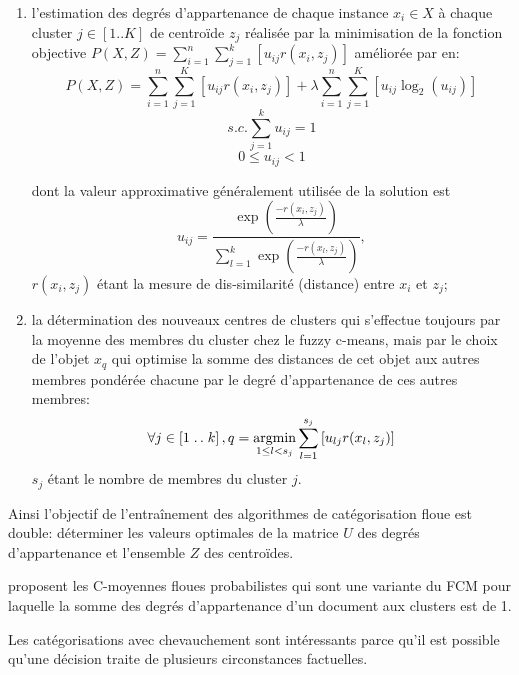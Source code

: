 \begin{enumerate}
 \item l'estimation des degrés d'appartenance de chaque instance $x_i \in X$ à chaque cluster $j \in [1..K]$ de centroïde $z_j$ réalisée par la minimisation de la fonction objective $P(X,Z) = \sum\limits_{i=1}^{n}\sum\limits_{j=1}^{k} \left[u_{ij}r(x_i,z_j)\right]$ \citep{krishnapuram2001fuzzycmedoids}  améliorée par \citet{sabzi2011fuzzykmedoids} en:
 \[P(X,Z) = \sum\limits_{i=1}^{n}\sum\limits_{j=1}^{K} \left[u_{ij}r(x_i,z_j)\right] + \lambda \sum\limits_{i=1}^{n}\sum\limits_{j=1}^{K} \left[ u_{ij}\log_2(u_{ij}) \right] \]
 \[s.c. \sum\limits_{j=1}^{k} u_{ij} = 1\]
 \[0 \leq u_{ij} < 1\]
 
 dont la valeur approximative généralement utilisée de la solution est \[u_{ij} = \frac{\exp\left(\frac{-r(x_i,z_j)}{\lambda}\right)}{\sum_{l=1}^{k}\exp\left(\frac{-r(x_l,z_j)}{\lambda}\right)},\] $r(x_i,z_j)$ étant la mesure de dis-similarité (distance) entre $x_i$ et  $z_j$;
 \item la détermination des nouveaux centres de clusters qui s'effectue toujours par la moyenne des membres du cluster chez le fuzzy c-means, mais par le choix de l'objet $x_q$ qui optimise la somme des distances de cet objet aux autres membres pondérée chacune par le degré d'appartenance de ces autres membres: \[\forall j \in  \left[1\mathrel{{.}\,{.}}\nobreak k \right], q = \mathop{\mathrm{argmin}}\limits\limits_{1 \leq l < s_j} \sum\limits_{l=1}^{s_j} \left[u_{lj}r(x_l,z_j)\right]\] $s_j$ étant le nombre de membres du cluster $j$.
\end{enumerate}
 Ainsi l'objectif de l'entraînement des algorithmes de catégorisation floue est double: déterminer les valeurs optimales de la matrice $U$ des degrés d'appartenance et l'ensemble $Z$ des centroïdes. 
 
 \citet{nefti2004probabilisticFuzzyCMeans} proposent les C-moyennes floues probabilistes qui sont une variante du FCM pour laquelle la somme des degrés d'appartenance  d'un document aux clusters est de 1.
 
 Les catégorisations avec chevauchement sont intéressants parce qu'il est possible qu'une décision traite de plusieurs circonstances factuelles.

